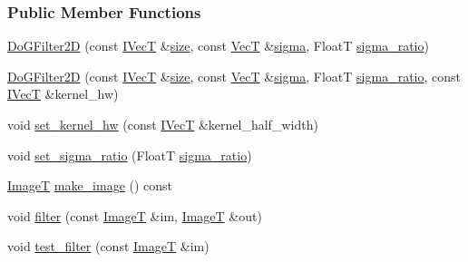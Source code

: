 \subsubsection*{Public Member Functions}
\begin{DoxyCompactItemize}
\item 
\hyperlink{classboxxer_1_1DoGFilter2D_ab423fa2c4bb16faea4c33a92ab08411c}{Do\+G\+Filter2D} (const \hyperlink{classboxxer_1_1GaussFIRFilter_a0083c8c9ab6032dd458b4dc93852c2b8}{I\+VecT} \&\hyperlink{classboxxer_1_1GaussFIRFilter_ac0d4e19bb2be3e8913e77283e7e4317e}{size}, const \hyperlink{classboxxer_1_1DoGFilter2D_a77bd6efdb8dc5643aa30c2575c9da261}{VecT} \&\hyperlink{classboxxer_1_1GaussFIRFilter_a66ced06c688fd544d5f1f8be39aa2125}{sigma}, FloatT \hyperlink{classboxxer_1_1DoGFilter2D_a68e3d95c06f7d41782be2d1a1db96ace}{sigma\+\_\+ratio})
\item 
\hyperlink{classboxxer_1_1DoGFilter2D_aa8b99c2a75dfa10fd171bf2661f05c6a}{Do\+G\+Filter2D} (const \hyperlink{classboxxer_1_1GaussFIRFilter_a0083c8c9ab6032dd458b4dc93852c2b8}{I\+VecT} \&\hyperlink{classboxxer_1_1GaussFIRFilter_ac0d4e19bb2be3e8913e77283e7e4317e}{size}, const \hyperlink{classboxxer_1_1DoGFilter2D_a77bd6efdb8dc5643aa30c2575c9da261}{VecT} \&\hyperlink{classboxxer_1_1GaussFIRFilter_a66ced06c688fd544d5f1f8be39aa2125}{sigma}, FloatT \hyperlink{classboxxer_1_1DoGFilter2D_a68e3d95c06f7d41782be2d1a1db96ace}{sigma\+\_\+ratio}, const \hyperlink{classboxxer_1_1GaussFIRFilter_a0083c8c9ab6032dd458b4dc93852c2b8}{I\+VecT} \&kernel\+\_\+hw)
\item 
void \hyperlink{classboxxer_1_1DoGFilter2D_a3fcf9339a299ad57e3427fce9d59661a}{set\+\_\+kernel\+\_\+hw} (const \hyperlink{classboxxer_1_1GaussFIRFilter_a0083c8c9ab6032dd458b4dc93852c2b8}{I\+VecT} \&kernel\+\_\+half\+\_\+width)
\item 
void \hyperlink{classboxxer_1_1DoGFilter2D_af6c4276ff6195d6052d834d9c7fbb04c}{set\+\_\+sigma\+\_\+ratio} (FloatT \hyperlink{classboxxer_1_1DoGFilter2D_a68e3d95c06f7d41782be2d1a1db96ace}{sigma\+\_\+ratio})
\item 
\hyperlink{classboxxer_1_1DoGFilter2D_aef097cf982b1705c47b2e2b34baf1bb1}{ImageT} \hyperlink{classboxxer_1_1DoGFilter2D_a78c7c1791abff3bc665bac7becc0dec1}{make\+\_\+image} () const 
\item 
void \hyperlink{classboxxer_1_1DoGFilter2D_a2d5cf92732000f8c444b32041b89fe00}{filter} (const \hyperlink{classboxxer_1_1DoGFilter2D_aef097cf982b1705c47b2e2b34baf1bb1}{ImageT} \&im, \hyperlink{classboxxer_1_1DoGFilter2D_aef097cf982b1705c47b2e2b34baf1bb1}{ImageT} \&out)
\item 
void \hyperlink{classboxxer_1_1DoGFilter2D_a560b334f15bc28f411b065b22ffd4bb7}{test\+\_\+filter} (const \hyperlink{classboxxer_1_1DoGFilter2D_aef097cf982b1705c47b2e2b34baf1bb1}{ImageT} \&im)
\end{DoxyCompactItemize}
